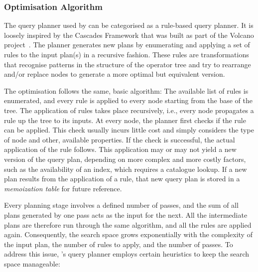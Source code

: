 \subsubsection{Optimisation Algorithm}

The query planner used by \cottontail{} can be categorised as a rule-based query planner. It is loosely inspired by the Cascades Framework \cite{Graefe:1995Cascades} that was built as part of the Volcano project~\cite{Graefe:1993Volcano}. The planner generates new plans by enumerating and applying a set of rules to the input plan(s) in a recursive fashion. These rules are transformations that recognise patterns in the structure of the operator tree and try to rearrange and/or replace nodes to generate a more optimal but equivalent version.

The optimisation follows the same, basic algorithm: The available list of rules is enumerated, and every rule is applied to every node starting from the base of the tree. The application of rules takes place recursively, i.e., every node propagates a rule up the tree to its inputs. At every node, the planner first checks if the rule can be applied. This check usually incurs little cost and simply considers the type of node and other, available properties. If the check is successful, the actual application of the rule follows. This application may or may not yield a new version of the query plan, depending on more complex and more costly factors, such as the availability of an index, which requires a catalogue lookup. If a new plan results from the application of a rule, that new query plan is stored in a \emph{memoization table} for future reference. 

Every planning stage involves a defined number of passes, and the sum of all plans generated by one pass acts as the input for the next. All the intermediate plans are therefore run through the same algorithm, and all the rules are applied again. Consequently, the search space grows exponentially with the complexity of the input plan, the number of rules to apply, and the number of passes. To address this issue, \cottontail{}'s query planner employs certain heuristics to keep the search space manageable:

